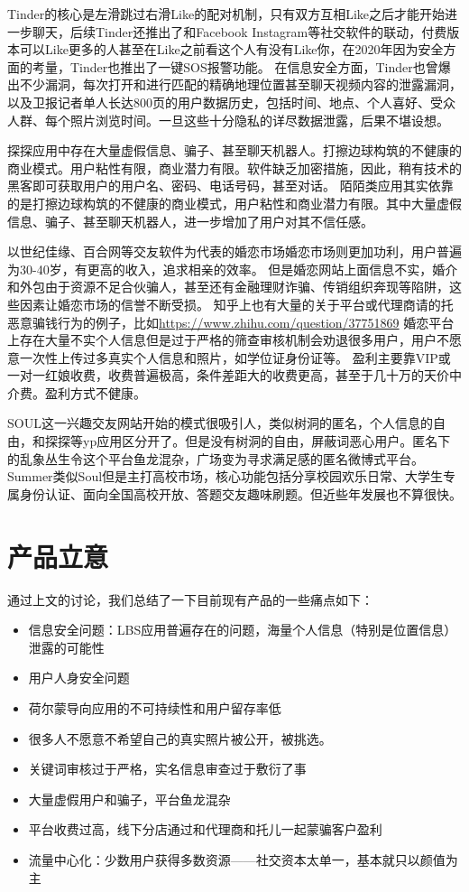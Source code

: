 \documentclass[UTF8]{ctexart}
\begin{document}
Tinder的核心是左滑跳过右滑Like的配对机制，只有双方互相Like之后才能开始进一步聊天，后续Tinder还推出了和Facebook Instagram等社交软件的联动，付费版本可以Like更多的人甚至在Like之前看这个人有没有Like你，在2020年因为安全方面的考量，Tinder也推出了一键SOS报警功能。\cite{WikiTinderFeatures}
在信息安全方面，Tinder也曾爆出不少漏洞，每次打开和进行匹配的精确地理位置甚至聊天视频内容的泄露漏洞，以及卫报记者单人长达800页的用户数据历史，包括时间、地点、个人喜好、受众人群、每个照片浏览时间。一旦这些十分隐私的详尽数据泄露，后果不堪设想。\cite{WikiTinderFeatures}

探探应用中存在大量虚假信息、骗子、甚至聊天机器人。打擦边球构筑的不健康的商业模式。用户粘性有限，商业潜力有限。软件缺乏加密措施，因此，稍有技术的黑客即可获取用户的用户名、密码、电话号码，甚至对话。\cite{WikiTantan}
陌陌类应用其实依靠的是打擦边球构筑的不健康的商业模式，用户粘性和商业潜力有限。其中大量虚假信息、骗子、甚至聊天机器人，进一步增加了用户对其不信任感。\cite{MoMoWhy}

以世纪佳缘、百合网等交友软件为代表的婚恋市场婚恋市场则更加功利，用户普遍为30-40岁，有更高的收入，追求相亲的效率。
但是婚恋网站上面信息不实，婚介和外包由于资源不足合伙骗人，甚至还有金融理财诈骗、传销组织奔现等陷阱，这些因素让婚恋市场的信誉不断受损。\cite{CheatTheLiving}
知乎上也有大量的关于平台或代理商请的托恶意骗钱行为的例子，比如\url{https://www.zhihu.com/question/37751869}
婚恋平台上存在大量不实个人信息但是过于严格的筛查审核机制会劝退很多用户，用户不愿意一次性上传过多真实个人信息和照片，如学位证身份证等。\cite{WikiJiayuan}
盈利主要靠VIP或一对一红娘收费，收费普遍极高，条件差距大的收费更高，甚至于几十万的天价中介费。盈利方式不健康。

SOUL这一兴趣交友网站开始的模式很吸引人，类似树洞的匿名，个人信息的自由，和探探等yp应用区分开了。但是没有树洞的自由，屏蔽词恶心用户。匿名下的乱象丛生令这个平台鱼龙混杂，广场变为寻求满足感的匿名微博式平台。\cite{Soul}
Summer类似Soul但是主打高校市场，核心功能包括分享校园欢乐日常、大学生专属身份认证、面向全国高校开放、答题交友趣味刷题。但近些年发展也不算很快。

\section{产品立意}
通过上文的讨论，我们总结了一下目前现有产品的一些痛点如下：

\begin{itemize}
    \item 信息安全问题：LBS应用普遍存在的问题，海量个人信息（特别是位置信息）泄露的可能性
    \item 用户人身安全问题
    \item 荷尔蒙导向应用的不可持续性和用户留存率低
    \item 很多人不愿意不希望自己的真实照片被公开，被挑选。
    \item 关键词审核过于严格，实名信息审查过于敷衍了事
    \item 大量虚假用户和骗子，平台鱼龙混杂
    \item 平台收费过高，线下分店通过和代理商和托儿一起蒙骗客户盈利
    \item 流量中心化：少数用户获得多数资源——社交资本太单一，基本就只以颜值为主
\end{itemize}
\end{document}

